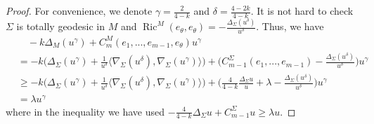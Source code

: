 \documentclass[11pt,letterpaper]{amsart}
\DeclareMathOperator{\Ric}{Ric}
\theoremstyle{definition}
\theoremstyle{remark}
\numberwithin{equation}{section}
\begin{document}
\begin{proof}
    For convenience, we denote $\gamma=\frac{2}{4-k}$ and $\delta=\frac{4-2k}{4-k}$.
    It is not hard to check $\Sigma$ is totally geodesic in $M$ and $\Ric^{M}(e_{\theta},e_{\theta} )=-\frac{\Delta_{\Sigma}(u^{\delta})}{u^{\delta}}$. Thus, we have
    \[
    \begin{aligned}
    &\quad -k\Delta_{M}(u^{\gamma})+C_{m}^{M}(e_{1},...,e_{m-1},e_{\theta})u^{\gamma}\\
    &=-k\big(\Delta_{\Sigma}(u^{\gamma})+\frac{1}{u^{\delta}}\langle \nabla_{\Sigma}(u^{\delta}),\nabla_{\Sigma}(u^{\gamma})\rangle\big) +\big(C_{m-1}^{\Sigma}(e_{1},...,e_{m-1})-\frac{\Delta_{\Sigma}(u^{\delta})}{u^{\delta}}\big)u^{\gamma}   \\
    &\geq -k\big(\Delta_{\Sigma}(u^{\gamma})+\frac{1}{u^{\delta}}\langle \nabla_{\Sigma}(u^{\delta}),\nabla_{\Sigma}(u^{\gamma})\rangle\big) +\big(\frac{4}{4-k}\frac{\Delta_{\Sigma}u}{u}+\lambda-\frac{\Delta_{\Sigma}(u^{\delta})}{u^{\delta}}\big)u^{\gamma}\\
    &=\lambda u^\gamma
    \end{aligned}
    \]
    where in the inequality we have used $-\frac{4}{4-k}\Delta_{\Sigma}u+C_{m-1}^{\Sigma}u\geq \lambda u$.


\end{proof}
\end{document}
